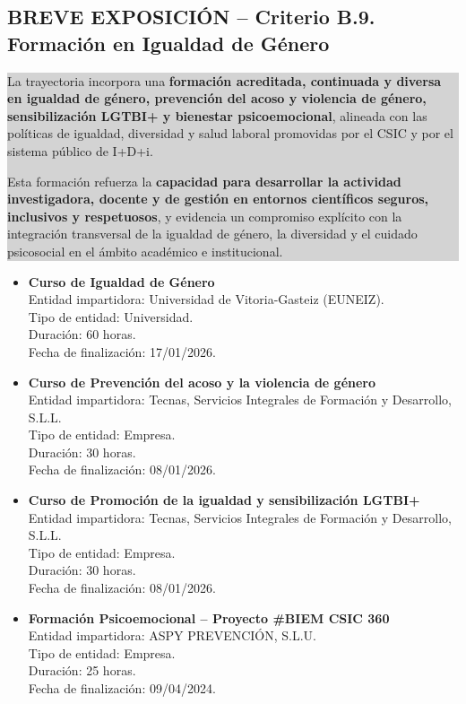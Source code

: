 \documentclass[11pt,a4paper]{article}
\newcommand{\breveexposicion}[2]{
    \subsection*{\color{darkgray}\textbf{BREVE EXPOSICIÓN -- #1}}
    \vspace{0.3em}
    \noindent\colorbox{lightgray}{%
        \begin{minipage}{0.97\textwidth}
        \vspace{0.5em}
        \color{darkgray}
        #2
        \vspace{0.5em}
        \end{minipage}
    }
    \vspace{1em}
}
\begin{document}
\breveexposicion{Criterio B.9. Formación en Igualdad de Género}{
La trayectoria incorpora una \textbf{formación acreditada, continuada y diversa en igualdad de género, prevención del acoso y violencia de género, sensibilización LGTBI+ y bienestar psicoemocional}, alineada con las políticas de igualdad, diversidad y salud laboral promovidas por el CSIC y por el sistema público de I+D+i.

Esta formación refuerza la \textbf{capacidad para desarrollar la actividad investigadora, docente y de gestión en entornos científicos seguros, inclusivos y respetuosos}, y evidencia un compromiso explícito con la integración transversal de la igualdad de género, la diversidad y el cuidado psicosocial en el ámbito académico e institucional.
}
\begin{itemize}[leftmargin=*]

    \item \textbf{Curso de Igualdad de Género}\\
    Entidad impartidora: Universidad de Vitoria-Gasteiz (EUNEIZ).\\
    Tipo de entidad: Universidad.\\
    Duración: 60 horas.\\
    Fecha de finalización: 17/01/2026.

    \item \textbf{Curso de Prevención del acoso y la violencia de género}\\
    Entidad impartidora: Tecnas, Servicios Integrales de Formación y Desarrollo, S.L.L.\\
    Tipo de entidad: Empresa.\\
    Duración: 30 horas.\\
    Fecha de finalización: 08/01/2026.

    \item \textbf{Curso de Promoción de la igualdad y sensibilización LGTBI+}\\
    Entidad impartidora: Tecnas, Servicios Integrales de Formación y Desarrollo, S.L.L.\\
    Tipo de entidad: Empresa.\\
    Duración: 30 horas.\\
    Fecha de finalización: 08/01/2026.

    \item \textbf{Formación Psicoemocional -- Proyecto \#BIEM CSIC 360}\\
    Entidad impartidora: ASPY PREVENCIÓN, S.L.U.\\
    Tipo de entidad: Empresa.\\
    Duración: 25 horas.\\
    Fecha de finalización: 09/04/2024.


\end{itemize}
\end{document}
